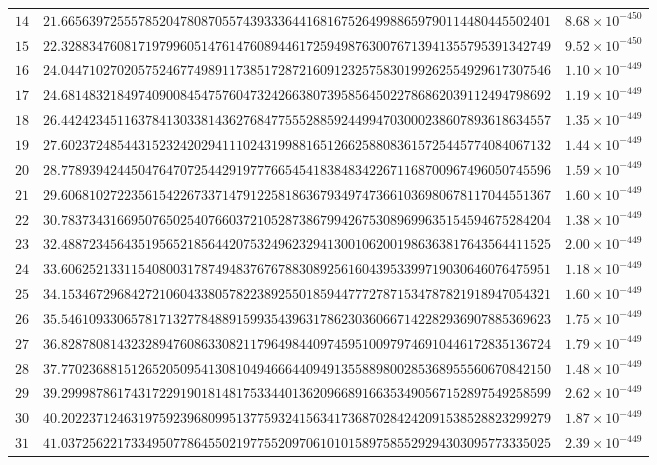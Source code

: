 \documentclass[12pt,reqno]{amsart}
\theoremstyle{remark}
\begin{document}
\begin{longtable}{clc}
$14$ & $21.6656397255578520478087055743933364416816752649988659790114480445502401$ & $8.68\times 10^{-450}$ \\
$15$ & $22.3288347608171979960514761476089446172594987630076713941355795391342749$ & $9.52\times 10^{-450}$ \\
$16$ & $24.0447102702057524677498911738517287216091232575830199262554929617307546$ & $1.10\times 10^{-449}$ \\
$17$ & $24.6814832184974090084547576047324266380739585645022786862039112494798692$ & $1.19\times 10^{-449}$ \\
$18$ & $26.4424234511637841303381436276847755528859244994703000238607893618634557$ & $1.35\times 10^{-449}$ \\
$19$ & $27.6023724854431523242029411102431998816512662588083615725445774084067132$ & $1.44\times 10^{-449}$ \\
$20$ & $28.7789394244504764707254429197776654541838483422671168700967496050745596$ & $1.59\times 10^{-449}$ \\
$21$ & $29.6068102722356154226733714791225818636793497473661036980678117044551367$ & $1.60\times 10^{-449}$ \\
$22$ & $30.7837343166950765025407660372105287386799426753089699635154594675284204$ & $1.38\times 10^{-449}$ \\
$23$ & $32.4887234564351956521856442075324962329413001062001986363817643564411525$ & $2.00\times 10^{-449}$ \\
$24$ & $33.6062521331154080031787494837676788308925616043953399719030646076475951$ & $1.18\times 10^{-449}$ \\
$25$ & $34.1534672968427210604338057822389255018594477727871534787821918947054321$ & $1.60\times 10^{-449}$ \\
$26$ & $35.5461093306578171327784889159935439631786230360667142282936907885369623$ & $1.75\times 10^{-449}$ \\
$27$ & $36.8287808143232894760863308211796498440974595100979746910446172835136724$ & $1.79\times 10^{-449}$ \\
$28$ & $37.7702368815126520509541308104946664409491355889800285368955560670842150$ & $1.48\times 10^{-449}$ \\
$29$ & $39.2999878617431722919018148175334401362096689166353490567152897549258599$ & $2.62\times 10^{-449}$ \\
$30$ & $40.2022371246319759239680995137759324156341736870284242091538528823299279$ & $1.87\times 10^{-449}$ \\
$31$ & $41.0372562217334950778645502197755209706101015897585529294303095773335025$ & $2.39\times 10^{-449}$ \\

\end{longtable}
\end{document}

